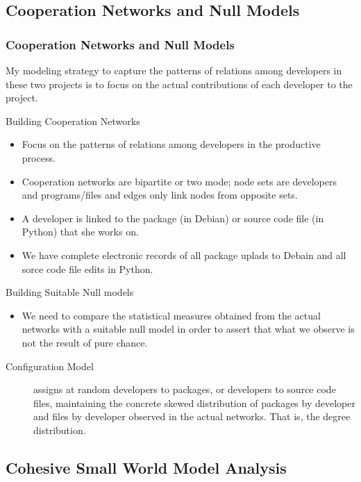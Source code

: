 \documentclass[ignorenonframetext,red,8pt,notes=hide]{beamer}
\begin{document}
\subsection{Cooperation Networks and Null Models}

\begin{frame}
\frametitle{Cooperation Networks and Null Models}

My modeling strategy to capture the patterns of relations among developers in these two projects is to focus on the actual contributions of each developer to the project. 

\begin{block}{Building Cooperation Networks}
\begin{itemize}
\item Focus on the patterns of relations among developers in the productive process.
\item Cooperation networks are bipartite or two mode; node sets are developers and programs/files and edges only link nodes from opposite sets.
\item A developer is linked to the package (in Debian) or source code file (in Python) that she works on.
\item We have complete electronic records of all package uplads to Debain and all sorce code file edits in Python.
\end{itemize}
\end{block}

\pause

\begin{block}{Building Suitable Null models}
\begin{itemize}
\item We need to compare the statistical measures obtained from the actual networks with a suitable null model in order to assert that what we observe is not the result of pure chance.
\end{itemize}
\begin{description}
\item [Configuration Model] assigns at random developers to packages, or developers to source code files, maintaining the concrete skewed distribution of packages by developer and files by developer observed in the actual networks. That is, the degree distribution.
\end{description}
\end{block}

\end{frame}


\subsection{Cohesive Small World Model Analysis}
\end{document}
